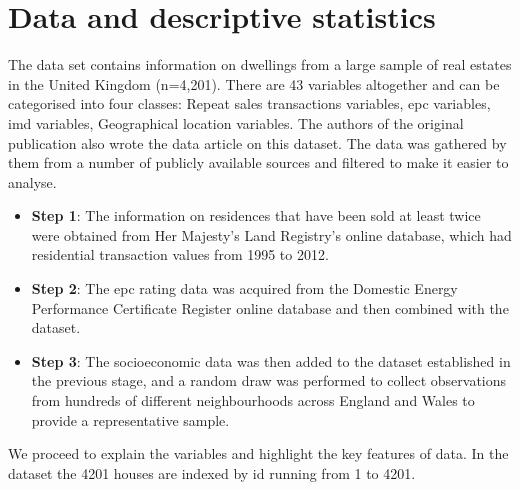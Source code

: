 \documentclass[12pt]{article}
\begin{document}
\section{Data and descriptive statistics}
The data set contains information on dwellings from a large sample of real estates in the United Kingdom (n=4,201). There are 43 variables altogether and can be categorised into four classes: Repeat sales transactions variables, \acrfull{epc} variables, \acrfull{imd} variables, Geographical location variables. The authors of the original publication also wrote the data article on this dataset. 
The data was gathered by them from a number of publicly available sources and filtered to make it easier to analyse.
\begin{itemize}
    \item \textbf{Step 1}: The information on residences that have been sold at least twice were obtained from Her Majesty's Land Registry's online database, which had residential transaction values from 1995 to 2012. 
    \item \textbf{Step 2}: The \acrshort{epc} rating data was acquired from the Domestic Energy Performance Certificate Register online database and then combined with the dataset. 
    \item \textbf{Step 3}: The socioeconomic data was then added to the dataset established in the previous stage, and a random draw was performed to collect observations from hundreds of different neighbourhoods across England and Wales to provide a representative sample. 
\end{itemize}
We proceed to explain the variables and highlight the key features of data. In the dataset the 4201 houses are indexed by id running from 1 to 4201.
\end{document}
